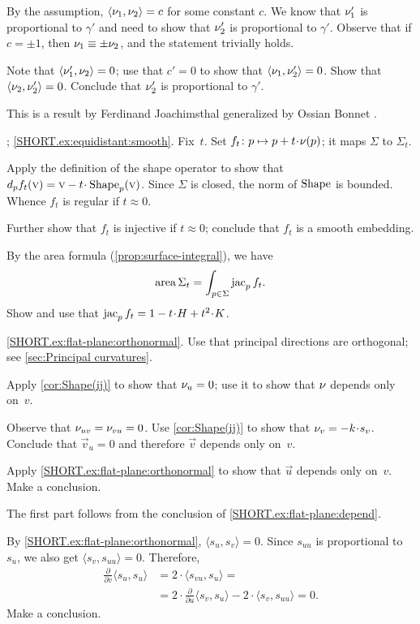 \begin{multicols}{2}
By the assumption, $\langle \nu_1,\nu_2\rangle= c$ for some constant $c$.
We know that
$\nu_1'$ is proportional to $\gamma'$ and need to show that $\nu_2'$ is proportional to $\gamma'$.
Observe that if $c=\pm1$, then $\nu_1\equiv\pm \nu_2$, and the statement trivially holds.

Note that $\langle\nu_1',\nu_2\rangle=0$;
use that $c'=0$ to show that $\langle\nu_1,\nu_2'\rangle=0$.
Show that $\langle\nu_2,\nu_2'\rangle=0$.
Conclude that $\nu_2'$ is proportional to $\gamma'$.

 This is a result by Ferdinand Joachimsthal \cite{joachimsthal} generalized by Ossian Bonnet \cite{bonnet}.

\parbf{\ref{ex:equidistant}};
\ref{SHORT.ex:equidistant:smooth}.
Fix~$t$.
Set $f_t\:p\mapsto p+t\cdot\Norm(p)$; it maps $\Sigma$ to $\Sigma_t$.

Apply the definition of the shape operator to show that $d_pf_t(\vec v)=\vec v-t\cdot\Shape_p(\vec v)$.
Since $\Sigma$ is closed, the norm of $\mathop{\rm Shape}\nolimits$ is bounded.
Whence $f_t$ is regular if $t\approx 0$.

Further show that $f_t$ is injective if $t\approx0$;
conclude that $f_t$ is a smooth embedding.

 By the area formula (\ref{prop:surface-integral}), we have
\[\mathop{\rm area}\nolimits\Sigma_t=\int_{p\in \Sigma}\mathop{\rm jac}\nolimits_pf_t.\]
Show and use that $\jac_pf_t=1-t\cdot H+t^2\cdot K$.

\parbf{\ref{ex:flat-plane};} \ref{SHORT.ex:flat-plane:orthonormal}.
Use that principal directions are orthogonal; see \ref{sec:Principal curvatures}.

Apply \ref{cor:Shape(ij)} to show that $\nu_u=0$; use it to show that $\nu$ depends only on~$v$.

Observe that $\nu_{uv}=\nu_{vu}=0$.
Use \ref{cor:Shape(ij)} to show that $\Norm_v=-k \cdot s_v$.
Conclude that $\vec v_u=0$ and therefore $\vec v$ depends only on~$v$.

Apply \ref{SHORT.ex:flat-plane:orthonormal} to show that $\vec u$ depends only on~$v$.
Make a conclusion.

The first part follows from the conclusion of \ref{SHORT.ex:flat-plane:depend}.

By \ref{SHORT.ex:flat-plane:orthonormal}, $\langle s_u,s_v\rangle=0$.
Since $s_{uu}$ is proportional to $s_u$, we also get $\langle s_{v},s_{uu}\rangle=0$.
Therefore,
\begin{align*}
\tfrac{\partial}{\partial v}\langle s_u,s_u\rangle&=2\cdot \langle s_{vu},s_u\rangle=
\\
&=2\cdot \tfrac{\partial}{\partial u}\langle s_v,s_u\rangle-2\cdot \langle s_{v},s_{uu}\rangle=0.
\end{align*}
Make a conclusion.


\end{multicols}
